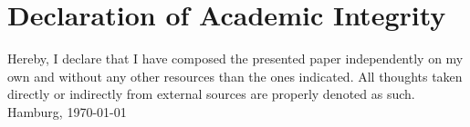 \chapter*{Declaration of Academic Integrity}
Hereby, I declare that I have composed the presented paper independently on my own and without any other resources than the ones indicated. All thoughts taken directly or indirectly from external sources are properly denoted as such.
\\[2em]
Hamburg, \today
\\[8em]
\theauthor